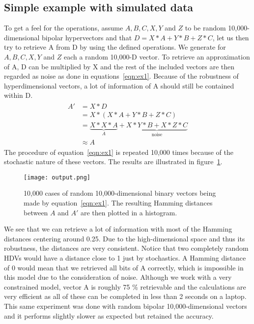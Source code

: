 \subsection*{Simple example with simulated data}
To get a feel for the operations, assume $A, B, C, X, Y$ and $Z$ to be random 10,000-dimensional bipolar hypervectors and that $D = X*A + Y*B + Z*C$, let us then try to retrieve A from D by using the defined operations. We generate for $A, B, C, X, Y$ and $Z$ each a random 10,000-D vector. To retrieve an approximation of A, D can be multiplied by X and the rest of the included vectors are then regarded as noise as done in equations~\ref{eqn:ex1}. Because of the robustness of hyperdimensional vectors, a lot of information of A should still be contained within D.
\begin{align}\label{eqn:ex1}
\begin{split}
    A' &= X * D \\
    &= X * (X * A + Y * B + Z * C) \\
    &= \underbrace{X * X * A}_A + \underbrace{X * Y * B + X * Z * C}_\text{noise} \\
    &\approx A
\end{split}
\end{align}
 The procedure of equation~\ref{eqn:ex1} is repeated 10,000 times because of the stochastic nature of these vectors. The results are illustrated in figure~\ref{fig:exm1}.
\begin{figure}[h]
    \centering
    \texttt{[image: output.png]}
    \caption{10,000 cases of random 10,000-dimensional binary vectors being made by equation~\ref{eqn:ex1}. The resulting Hamming distances between $A$ and $A'$ are then plotted in a histogram.}
    \label{fig:exm1}
\end{figure}
We see that we can retrieve a lot of information with most of the Hamming distances centering around 0.25. Due to the high-dimensional space and thus its robustness, the distances are very consistent. Notice that two completely random HDVs would have a distance close to 1 just by stochastics. A Hamming distance of 0 would mean that we retrieved all bits of A correctly, which is impossible in this model due to the consideration of noise. Although we work with a very constrained model, vector A is roughly 75 \% retrievable and the calculations are very efficient as all of these can be completed in less than 2 seconds on a laptop. This same experiment was done with random bipolar 10,000-dimensional vectors and it performs slightly slower as expected but retained the accuracy.
